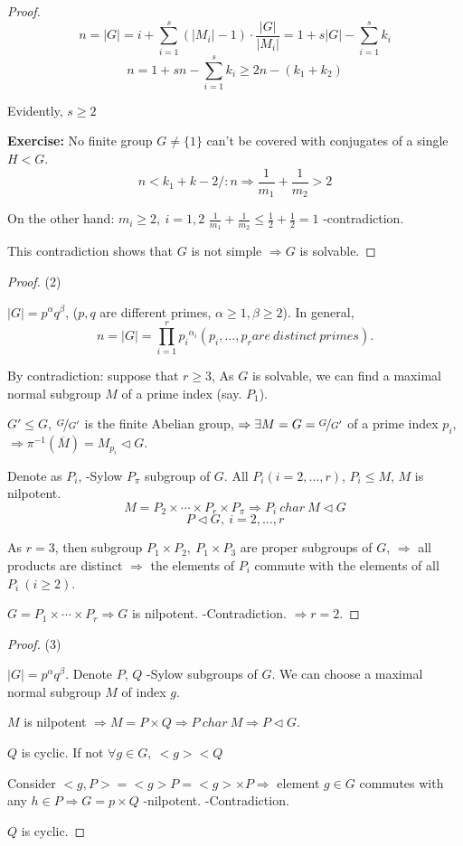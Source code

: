 \documentclass[12pt, a4paper]{article}
\theoremstyle{definition}
\begin{document}
\begin{proof}
    \par
    \[n=|G|=i+\sum_{i=1}^{s}(|M_i|-1)\cdot \frac{|G|}{|M_i|} = 1+s|G|-\sum_{i=1}^{s}k_i\]
    \[n = 1+sn- \sum_{i=1}^{s}k_i  \geqslant2n-(k_1+k_2)\]
    \par
    Evidently, $s\geqslant 2$
    \par
    \textbf{Exercise:} No finite  group $G\neq \{1\}$ can't be covered with conjugates of a 
    single $H<G$.
    \[n<k_1+k-2/:n \Rightarrow \frac1{m_1}+\frac1{m_2} >2\]
    \par
    On the other hand: $m_i\geqslant2,\ i=1,2 $
    $\frac1{m_1}+\frac1{m_2} \leqslant \frac12+\frac12 =1 $ -contradiction.
    \par
    This contradiction shows that $G$ is not simple $\Rightarrow G$ is solvable.
    \par
\end{proof}
\begin{proof}
    (2)
    \par
    $|G|=p^\alpha q^\beta$, ($p,q$ are different primes, $\alpha \geqslant 1,\beta \geqslant 
    2 $). In general, 
    \[n=|G| =\prod_{i=1}^r{p_i}^{\alpha_i} (p_i,\ldots,p_r are\ distinct\ primes). \]
    \par
    By contradiction: suppose that $r\geqslant 3 $, As $G$ is solvable, we can find a maximal
    normal subgroup $M$ of a prime index (say. $P_1$).
    \par
    $G'\leqslant G$, $\nicefrac{G}{G'} $ is the finite Abelian group, $\Rightarrow \exists M
    = G = \nicefrac{G}{G'} $ of a prime index $p_i$, $\Rightarrow \pi^{-1} (\overline{M}) =
    M_{p_i} \lhd G$.
    \par
    Denote as $P_i$, -Sylow $P_\pi$ subgroup of $G$. All $P_i(i=2,\ldots,r) $, $P_i 
    \leqslant M$, $M$ is nilpotent.
    \[M=P_2\times \cdots \times P_r \times P_\pi \Rightarrow P_i\ char\ M\lhd G\]
    \[P\lhd G ,\ i=2,\ldots,r \]
    \par
    As $r = 3 $, then subgroup $P_1\times P_2,\ P_1 \times P_3 $ are proper subgroups of $G$,
    $\Rightarrow$ all products are distinct $\Rightarrow$ the elements of $P_i$ commute with
    the elements of all $P_i\ (i\geqslant 2) $.
    \par
    $G = P_1\times \cdots \times P_r \Rightarrow G $ is nilpotent. -Contradiction. 
    $\Rightarrow r = 2 $.
    \par
\end{proof}
\begin{proof}
    (3)
    \par
    $|G|=p^\alpha q^\beta$. Denote $P$, $Q$ -Sylow subgroups of $G$. We can choose a maximal 
    normal subgroup $M$ of index $g$.
    \par
    $M$ is nilpotent $\Rightarrow M=P\times Q \Rightarrow P\ char\ M \Rightarrow P \lhd G$.
    \par
    $Q$ is cyclic. If not $\forall g\in G,\ <g><Q$
    \par
    Consider $<g,P>=<g>P=<g>\times P \Rightarrow$ element $g\in G$ commutes with any $h\in P
    \Rightarrow G=p\times Q$ -nilpotent. -Contradiction.
    \par
    $Q$ is cyclic.
    \par
\end{proof}
\end{document}
